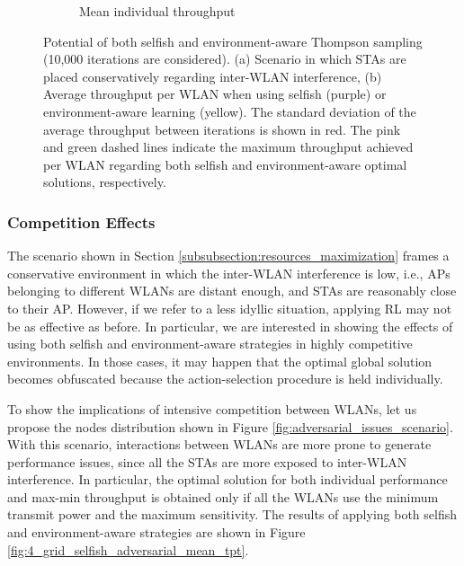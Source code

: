 \documentclass[preprint,12pt]{elsarticle}
\begin{document}
\begin{figure}[h!]
\begin{subfigure}[b]{0.4\textwidth}
		\caption{Mean individual throughput}
		\label{fig:4_grid_selfish_benefits_mean_tpt}
	\end{subfigure}
	\caption{Potential of both selfish and environment-aware Thompson sampling (10,000 iterations are considered). (a) Scenario in which STAs are placed conservatively regarding inter-WLAN interference, (b) Average throughput per WLAN when using selfish (purple) or environment-aware learning (yellow). The standard deviation of the average throughput between iterations is shown in red. The pink and green dashed lines indicate the maximum throughput achieved per WLAN regarding both selfish and environment-aware optimal solutions, respectively.}
	\label{fig:4_grid_selfish_benefits}
\end{figure} 	

\subsubsection{Competition Effects}
\label{subsubsection:competition}  
The scenario shown in Section \ref{subsubsection:resources_maximization} frames a conservative environment in which the inter-WLAN interference is low, i.e., APs belonging to different WLANs are distant enough, and STAs are reasonably close to their AP. However, if we refer to a less idyllic situation, applying RL may not be as effective as before. In particular, we are interested in showing the effects of using both selfish and environment-aware strategies in highly competitive environments. In those cases, it may happen that the optimal global solution becomes obfuscated because the action-selection procedure is held individually. 

To show the implications of intensive competition between WLANs, let us propose the nodes distribution shown in Figure \ref{fig:adversarial_issues_scenario}. With this scenario, interactions between WLANs are more prone to generate performance issues, since all the STAs are more exposed to inter-WLAN interference. In particular, the optimal solution for both individual performance and max-min throughput is obtained only if all the WLANs use the minimum transmit power and the maximum sensitivity. The results of applying both selfish and environment-aware strategies are shown in Figure \ref{fig:4_grid_selfish_adversarial_mean_tpt}. 
\end{document}

